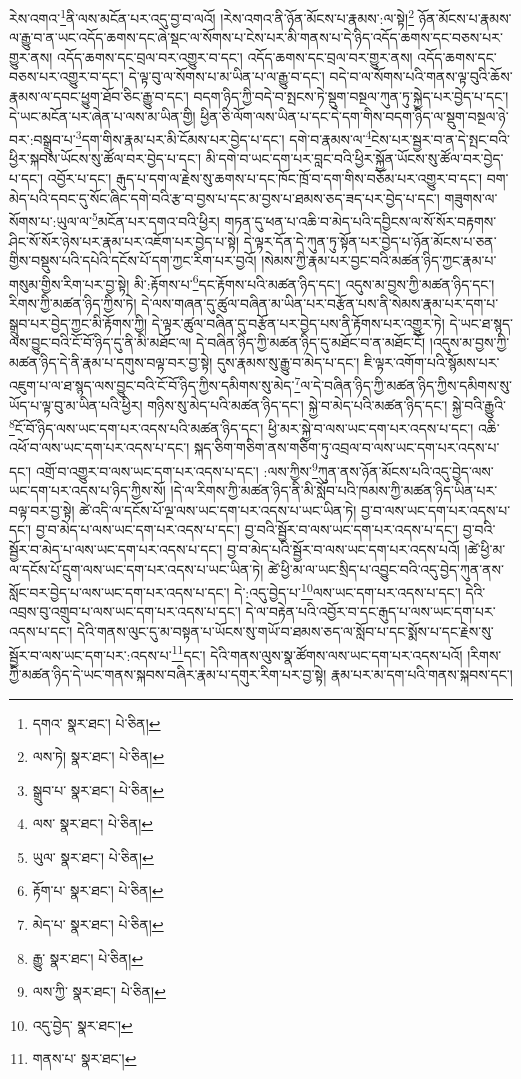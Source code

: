 རེས་འགའ་\footnote{དགའ་  སྣར་ཐང་།  པེ་ཅིན། }ནི་ལས་མངོན་པར་འདུ་བྱ་བ་ལའོ། །རེས་འགའ་ནི་ཉོན་མོངས་པ་རྣམས་:ལ་སྟེ།\footnote{ལས་ཏེ།  སྣར་ཐང་།  པེ་ཅིན། } ཉོན་མོངས་པ་རྣམས་ལ་རྒྱུ་བ་ན་ཡང་འདོད་ཆགས་དང་ཞེ་སྡང་ལ་སོགས་པ་ངེས་པར་མི་གནས་པ་དེ་ཉིད་འདོད་ཆགས་དང་བཅས་པར་གྱུར་ནས། འདོད་ཆགས་དང་བྲལ་བར་འགྱུར་བ་དང་། འདོད་ཆགས་དང་བྲལ་བར་གྱུར་ནས། འདོད་ཆགས་དང་བཅས་པར་འགྱུར་བ་དང་། དེ་ལྟ་བུ་ལ་སོགས་པ་མ་ཡིན་པ་ལ་རྒྱུ་བ་དང་། བདེ་བ་ལ་སོགས་པའི་གནས་ལྟ་བུའི་ཆོས་རྣམས་ལ་དབང་ཕྱུག་ཐོབ་ཅིང་རྒྱུ་བ་དང་། བདག་ཉིད་ཀྱི་བདེ་བ་སྤངས་ཏེ་སྡུག་བསྔལ་ཀུན་ཏུ་སྐྱེད་པར་བྱེད་པ་དང་། དེ་ཡང་མངོན་པར་ཞེན་པ་ལས་མ་ཡིན་གྱི། ཕྱིན་ཅི་ལོག་ལས་ཡིན་པ་དང་དེ་དག་གིས་བདག་ཉིད་ལ་སྡུག་བསྔལ་ཉེ་བར་:བསྒྲུབ་པ་\footnote{སྒྲུབ་པ་  སྣར་ཐང་།  པེ་ཅིན། }དག་གིས་རྣམ་པར་མི་ངོམས་པར་བྱེད་པ་དང་། དགེ་བ་རྣམས་ལ་\footnote{ལས་  སྣར་ཐང་།  པེ་ཅིན། }ངེས་པར་སྦྱར་བ་ན་དེ་སྤང་བའི་ཕྱིར་སྐབས་ཡོངས་སུ་ཚོལ་བར་བྱེད་པ་དང་། མི་དགེ་བ་ཡང་དག་པར་བླང་བའི་ཕྱིར་སྐྱོན་ཡོངས་སུ་ཚོལ་བར་བྱེད་པ་དང་། འབྱོར་པ་དང་། རྒུད་པ་དག་ལ་རྗེས་སུ་ཆགས་པ་དང་ཁོང་ཁྲོ་བ་དག་གིས་བཅོམ་པར་འགྱུར་བ་དང་། བག་མེད་པའི་དབང་དུ་སོང་ཞིང་དགེ་བའི་རྩ་བ་བྱས་པ་དང་མ་བྱས་པ་ཐམས་ཅད་ཟད་པར་བྱེད་པ་དང་། གཟུགས་ལ་སོགས་པ་:ཡུལ་ལ་\footnote{ཡུལ་  སྣར་ཐང་།  པེ་ཅིན། }མངོན་པར་དགའ་བའི་ཕྱིར། གཏན་དུ་ཕན་པ་འཆི་བ་མེད་པའི་དབྱིངས་ལ་སོ་སོར་བརྟགས་ཤིང་སོ་སོར་ཉེས་པར་རྣམ་པར་འཇོག་པར་བྱེད་པ་སྟེ། དེ་ལྟར་དོན་དེ་ཀུན་ཏུ་སྟོན་པར་བྱེད་པ་ཉོན་མོངས་པ་ཅན་གྱིས་བསྡུས་པའི་དཔེའི་དངོས་པོ་དག་ཀྱང་རིག་པར་བྱའོ། །སེམས་ཀྱི་རྣམ་པར་བྱང་བའི་མཚན་ཉིད་ཀྱང་རྣམ་པ་གསུམ་གྱིས་རིག་པར་བྱ་སྟེ། མི་:རྟོགས་པ་\footnote{རྟོག་པ་  སྣར་ཐང་།  པེ་ཅིན། }དང་རྟོགས་པའི་མཚན་ཉིད་དང་། འདུས་མ་བྱས་ཀྱི་མཚན་ཉིད་དང་། རིགས་ཀྱི་མཚན་ཉིད་ཀྱིས་ཏེ། དེ་ལས་གཞན་དུ་ཚུལ་བཞིན་མ་ཡིན་པར་བརྩོན་པས་ནི་སེམས་རྣམ་པར་དག་པ་སྒྲུབ་པར་བྱེད་ཀྱང་མི་རྟོགས་ཀྱི། དེ་ལྟར་ཚུལ་བཞིན་དུ་བརྩོན་པར་བྱེད་པས་ནི་རྟོགས་པར་འགྱུར་ཏེ། དེ་ཡང་ཐ་སྙད་ལས་བྱུང་བའི་ངོ་བོ་ཉིད་དུ་ནི་མི་མཐོང་ལ། དེ་བཞིན་ཉིད་ཀྱི་མཚན་ཉིད་དུ་མཐོང་བ་ན་མཐོང་ངོ། །འདུས་མ་བྱས་ཀྱི་མཚན་ཉིད་དེ་ནི་རྣམ་པ་དགུས་བལྟ་བར་བྱ་སྟེ། དུས་རྣམས་སུ་རྒྱུ་བ་མེད་པ་དང་། ཇི་ལྟར་འགོག་པའི་སྙོམས་པར་འཇུག་པ་ལ་ཐ་སྙད་ལས་བྱུང་བའི་ངོ་བོ་ཉིད་ཀྱིས་དམིགས་སུ་མེད་\footnote{མེད་པ་  སྣར་ཐང་།  པེ་ཅིན། }ལ་དེ་བཞིན་ཉིད་ཀྱི་མཚན་ཉིད་ཀྱིས་དམིགས་སུ་ཡོད་པ་ལྟ་བུ་མ་ཡིན་པའི་ཕྱིར། གཉིས་སུ་མེད་པའི་མཚན་ཉིད་དང་། སྐྱེ་བ་མེད་པའི་མཚན་ཉིད་དང་། སྐྱེ་བའི་རྒྱུའི་\footnote{རྒྱུ་  སྣར་ཐང་།  པེ་ཅིན། }ངོ་བོ་ཉིད་ལས་ཡང་དག་པར་འདས་པའི་མཚན་ཉིད་དང་། ཕྱི་མར་སྐྱེ་བ་ལས་ཡང་དག་པར་འདས་པ་དང་། འཆི་འཕོ་བ་ལས་ཡང་དག་པར་འདས་པ་དང་། སྐད་ཅིག་གཅིག་ནས་གཅིག་ཏུ་འབྲལ་བ་ལས་ཡང་དག་པར་འདས་པ་དང་། འགྲོ་བ་འགྱུར་བ་ལས་ཡང་དག་པར་འདས་པ་དང་། :ལས་ཀྱིས་\footnote{ལས་ཀྱི་  སྣར་ཐང་།  པེ་ཅིན། }ཀུན་ནས་ཉོན་མོངས་པའི་འདུ་བྱེད་ལས་ཡང་དག་པར་འདས་པ་ཉིད་ཀྱིས་སོ། །དེ་ལ་རིགས་ཀྱི་མཚན་ཉིད་ནི་མི་སློབ་པའི་ཁམས་ཀྱི་མཚན་ཉིད་ཡིན་པར་བལྟ་བར་བྱ་སྟེ། ཚེ་འདི་ལ་དངོས་པོ་ལྔ་ལས་ཡང་དག་པར་འདས་པ་ཡང་ཡིན་ཏེ། བྱ་བ་ལས་ཡང་དག་པར་འདས་པ་དང་། བྱ་བ་མེད་པ་ལས་ཡང་དག་པར་འདས་པ་དང་། བྱ་བའི་སྦྱོར་བ་ལས་ཡང་དག་པར་འདས་པ་དང་། བྱ་བའི་སྦྱོར་བ་མེད་པ་ལས་ཡང་དག་པར་འདས་པ་དང་། བྱ་བ་མེད་པའི་སྦྱོར་བ་ལས་ཡང་དག་པར་འདས་པའོ། །ཚེ་ཕྱི་མ་ལ་དངོས་པོ་དྲུག་ལས་ཡང་དག་པར་འདས་པ་ཡང་ཡིན་ཏེ། ཚེ་ཕྱི་མ་ལ་ཡང་སྲིད་པ་འབྱུང་བའི་འདུ་བྱེད་ཀུན་ནས་སློང་བར་བྱེད་པ་ལས་ཡང་དག་པར་འདས་པ་དང་། དེ་:འདུ་བྱེད་པ་\footnote{འདུ་བྱེད་  སྣར་ཐང་། }ལས་ཡང་དག་པར་འདས་པ་དང་། དེའི་འབྲས་བུ་འགྲུབ་པ་ལས་ཡང་དག་པར་འདས་པ་དང་། དེ་ལ་བརྟེན་པའི་འབྱོར་བ་དང་རྒུད་པ་ལས་ཡང་དག་པར་འདས་པ་དང་། དེའི་གནས་ལུང་དུ་མ་བསྟན་པ་ཡོངས་སུ་གཡོ་བ་ཐམས་ཅད་ལ་སློབ་པ་དང་སྨོས་པ་དང་རྗེས་སུ་སྦྱོར་བ་ལས་ཡང་དག་པར་:འདས་པ་\footnote{གནས་པ་  སྣར་ཐང་། }དང་། དེའི་གནས་ལུས་སྣ་ཚོགས་ལས་ཡང་དག་པར་འདས་པའོ། །རིགས་ཀྱི་མཚན་ཉིད་དེ་ཡང་གནས་སྐབས་བཞིར་རྣམ་པ་དགུར་རིག་པར་བྱ་སྟེ། རྣམ་པར་མ་དག་པའི་གནས་སྐབས་དང་། 